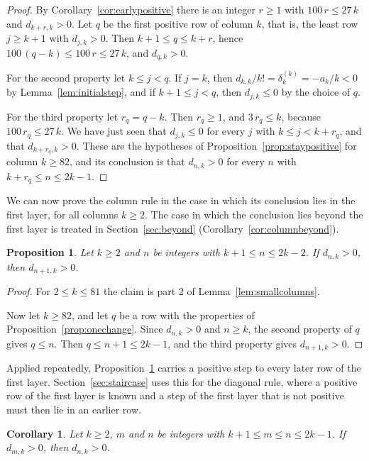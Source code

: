 \documentclass{amsart}
\newtheorem{proposition}[theorem]{Proposition}
\newtheorem{corollary}[theorem]{Corollary}
\theoremstyle{definition}
\theoremstyle{remark}
\numberwithin{equation}{section}
\begin{document}
\begin{proof}
By Corollary~\ref{cor:earlypositive} there is an integer $r\ge1$ with
$100\,r\le27\,k$ and $d_{k+r,k}>0$. Let $q$ be the first positive row of
column $k$, that is, the least row $j\ge k+1$ with $d_{j,k}>0$. Then
$k+1\le q\le k+r$, hence $100\,(q-k)\le100\,r\le27\,k$, and $d_{q,k}>0$.

For the second property let $k\le j<q$. If $j=k$, then
$d_{k,k}/k!=\delta^{(k)}_k=-a_k/k<0$ by Lemma~\ref{lem:initialstep}, and if
$k+1\le j<q$, then $d_{j,k}\le0$ by the choice of $q$.

For the third property let $r_q=q-k$. Then $r_q\ge1$, and $3\,r_q\le k$,
because $100\,r_q\le27\,k$. We have just seen that $d_{j,k}\le0$ for every
$j$ with $k\le j<k+r_q$, and that $d_{k+r_q,k}>0$. These are the hypotheses
of Proposition~\ref{prop:staypositive} for column $k\ge82$, and its
conclusion is that $d_{n,k}>0$ for every $n$ with $k+r_q\le n\le2k-1$.
\end{proof}

We can now prove the column rule in the case in which its conclusion lies
in the first layer, for all columns $k\ge2$. The case in which the
conclusion lies beyond the first layer is
treated in Section~\ref{sec:beyond} (Corollary~\ref{cor:columnbeyond}).

\begin{proposition}\label{prop:layerpersistence}
Let $k\ge2$ and $n$ be integers with
$k+1\le n\le2k-2$. If $d_{n,k}>0$, then $d_{n+1,k}>0$.
\end{proposition}

\begin{proof}
For $2\le k\le81$ the claim is part 2 of
Lemma~\ref{lem:smallcolumns}.

Now let $k\ge82$, and let $q$ be a row with the properties of
Proposition~\ref{prop:onechange}. Since $d_{n,k}>0$ and $n\ge k$, the
second property of $q$ gives $q\le n$. Then $q\le n+1\le2k-1$, and the
third property gives $d_{n+1,k}>0$.
\end{proof}

Applied repeatedly, Proposition~\ref{prop:layerpersistence} carries a
positive step to every later row of the first layer.
Section~\ref{sec:staircase} uses this for the diagonal rule, where a
positive row of the first layer is known and a step of the first layer
that is not positive must then lie in an earlier row.

\begin{corollary}\label{cor:layerpersistenceall}
Let $k\ge2$, $m$ and $n$ be integers with
$k+1\le m\le n\le2k-1$. If $d_{m,k}>0$, then $d_{n,k}>0$.
\end{corollary}
\end{document}
